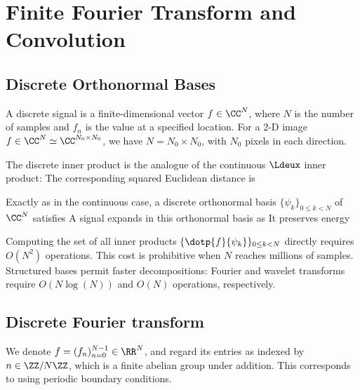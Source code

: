 \section{Finite Fourier Transform and Convolution}
\label{sec-dft}

                                           
\subsection{Discrete Orthonormal Bases}

A discrete signal is a finite-dimensional vector $f \in \CC^N$, where $N$ is the number of samples and $f_n$ is the value at a specified location. For a 2-D image $f \in \CC^N \simeq \CC^{N_0 \times N_0}$, we have $N = N_0 \times N_0$, with $N_0$ pixels in each direction.

The discrete inner product is the analogue of the continuous $\Ldeux$ inner product:
The corresponding squared Euclidean distance is

Exactly as in the continuous case, a discrete orthonormal basis $\{ \psi_k \}_{0 \leq k < N }$ of $\CC^N$ satisfies
A signal expands in this orthonormal basis as
It preserves energy

Computing the set of all inner products $\{\dotp{f}{\psi_k}\}_{0 \leq k < N}$ directly requires $O(N^2)$ operations.
This cost is prohibitive when $N$ reaches millions of samples. Structured bases permit faster decompositions: Fourier and wavelet transforms require $O(N\log(N))$ and $O(N)$ operations, respectively.


                                                
\subsection{Discrete Fourier transform}

We denote $f = (f_n)_{n=0}^{N-1} \in \RR^N$, and regard its entries as indexed by $n \in \ZZ/N\ZZ$, which is a finite abelian group under addition. This corresponds to using periodic boundary conditions.


